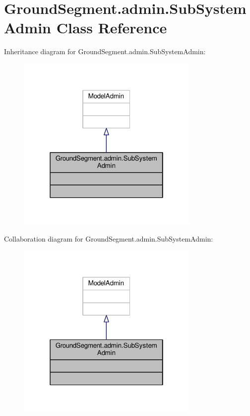 \hypertarget{class_ground_segment_1_1admin_1_1_sub_system_admin}{}\section{Ground\+Segment.\+admin.\+Sub\+System\+Admin Class Reference}
\label{class_ground_segment_1_1admin_1_1_sub_system_admin}


Inheritance diagram for Ground\+Segment.\+admin.\+Sub\+System\+Admin\+:\nopagebreak
\begin{figure}[H]
\begin{center}
\leavevmode
\includegraphics[width=250pt]{class_ground_segment_1_1admin_1_1_sub_system_admin__inherit__graph}
\end{center}
\end{figure}


Collaboration diagram for Ground\+Segment.\+admin.\+Sub\+System\+Admin\+:\nopagebreak
\begin{figure}[H]
\begin{center}
\leavevmode
\includegraphics[width=250pt]{class_ground_segment_1_1admin_1_1_sub_system_admin__coll__graph}
\end{center}
\end{figure}


